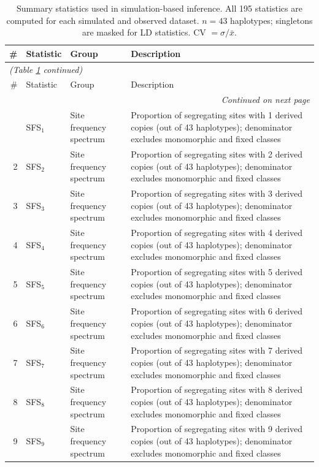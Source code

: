\begin{longtable}{@{}rllp{7.5cm}@{}}
\caption{Summary statistics used in simulation-based inference. All 195 statistics are computed for each simulated and observed dataset. $n = 43$ haplotypes; singletons are masked for LD statistics. CV $= \sigma / \bar{x}$.} \label{tab:summary_stats} \\
\toprule
\# & Statistic & Group & Description \\
\midrule
\endfirsthead
\multicolumn{4}{l}{\small\itshape (Table \ref{tab:summary_stats} continued)} \\
\toprule
\# & Statistic & Group & Description \\
\midrule
\endhead
\midrule
\multicolumn{4}{r}{\small\itshape Continued on next page} \\
\endfoot
\bottomrule
\endlastfoot
1 & SFS$_{1}$ & Site frequency spectrum & Proportion of segregating sites with 1 derived copies (out of 43 haplotypes); denominator excludes monomorphic and fixed classes \\
2 & SFS$_{2}$ & Site frequency spectrum & Proportion of segregating sites with 2 derived copies (out of 43 haplotypes); denominator excludes monomorphic and fixed classes \\
3 & SFS$_{3}$ & Site frequency spectrum & Proportion of segregating sites with 3 derived copies (out of 43 haplotypes); denominator excludes monomorphic and fixed classes \\
4 & SFS$_{4}$ & Site frequency spectrum & Proportion of segregating sites with 4 derived copies (out of 43 haplotypes); denominator excludes monomorphic and fixed classes \\
5 & SFS$_{5}$ & Site frequency spectrum & Proportion of segregating sites with 5 derived copies (out of 43 haplotypes); denominator excludes monomorphic and fixed classes \\
6 & SFS$_{6}$ & Site frequency spectrum & Proportion of segregating sites with 6 derived copies (out of 43 haplotypes); denominator excludes monomorphic and fixed classes \\
7 & SFS$_{7}$ & Site frequency spectrum & Proportion of segregating sites with 7 derived copies (out of 43 haplotypes); denominator excludes monomorphic and fixed classes \\
8 & SFS$_{8}$ & Site frequency spectrum & Proportion of segregating sites with 8 derived copies (out of 43 haplotypes); denominator excludes monomorphic and fixed classes \\
9 & SFS$_{9}$ & Site frequency spectrum & Proportion of segregating sites with 9 derived copies (out of 43 haplotypes); denominator excludes monomorphic and fixed classes \\

\end{longtable}

